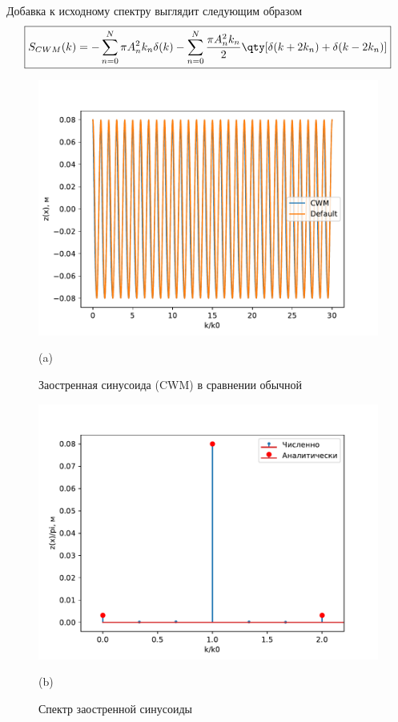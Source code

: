 \documentclass[a4paper,14pt]{extarticle}
\begin{document}
Добавка к исходному спектру выглядит следующим образом
\begin{gather}
    \label{eq:}
    \boxed{
    S_{CWM}(k) = - \sum\limits_{n=0}^{N} \pi A_{n}^2 k_n \delta(k) - 
    \sum\limits_{n=0}^{N} \frac{\pi A_n^2 k_n}{2} \qty[\delta(k+2k_n) +
    \delta(k-2k_n)]
}
\end{gather}

\begin{figure}[H]
    \begin{minipage}{0.49\linewidth}
        \centering
        \includegraphics[width=\linewidth]{cwm_surface.pdf}

        (a)
        \caption{Заостренная синусоида (CWM) в сравнении обычной}
        \label{fig:1}
    \end{minipage}
    \hfill
    \begin{minipage}{0.49\linewidth}
        \centering
        \includegraphics[width=\linewidth]{cwm_spectrum.pdf}

        (b)
        \caption{Спектр заостренной синусоиды}
        \label{fig:2}
    \end{minipage}

\end{figure}
\end{document}
